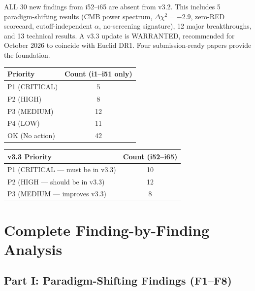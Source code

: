 \documentclass[11pt,a4paper]{article}
\begin{document}
\begin{tcolorbox}[colback=blue!5!white, colframe=blue!60!black, title=Wave 5 Assessment: v3.3 Warranted]
ALL 30 new findings from i52--i65 are absent from v3.2. This includes 5 paradigm-shifting results (CMB power spectrum, $\Delta\chi^2 = -2.9$, zero-RED scorecard, cutoff-independent $\alpha$, no-screening signature), 12 major breakthroughs, and 13 technical results. A v3.3 update is WARRANTED, recommended for October 2026 to coincide with Euclid DR1. Four submission-ready papers provide the foundation.
\end{tcolorbox}

\begin{center}
\begin{tabular}{lc}
\toprule
\textbf{Priority} & \textbf{Count (i1--i51 only)} \\
\midrule
P1 (CRITICAL) & 5 \\
P2 (HIGH) & 8 \\
P3 (MEDIUM) & 12 \\
P4 (LOW) & 11 \\
OK (No action) & 42 \\
\bottomrule
\end{tabular}
\end{center}

\begin{center}
\begin{tabular}{lc}
\toprule
\textbf{v3.3 Priority} & \textbf{Count (i52--i65)} \\
\midrule
P1 (CRITICAL --- must be in v3.3) & 10 \\
P2 (HIGH --- should be in v3.3) & 12 \\
P3 (MEDIUM --- improves v3.3) & 8 \\
\bottomrule
\end{tabular}
\end{center}


\section{Complete Finding-by-Finding Analysis}

\subsection{Part I: Paradigm-Shifting Findings (F1--F8)}
\end{document}
